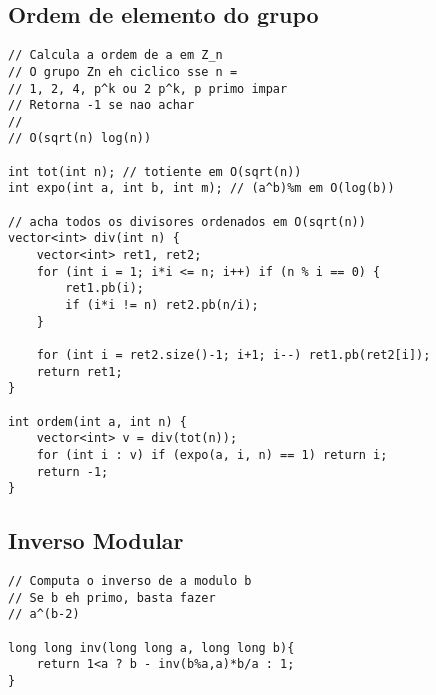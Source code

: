 \documentclass[12pt, a4paper, twoside]{article}
\begin{document}
\subsection{Ordem de elemento do grupo}
\begin{lstlisting}
// Calcula a ordem de a em Z_n
// O grupo Zn eh ciclico sse n = 
// 1, 2, 4, p^k ou 2 p^k, p primo impar
// Retorna -1 se nao achar
//
// O(sqrt(n) log(n))

int tot(int n); // totiente em O(sqrt(n))
int expo(int a, int b, int m); // (a^b)%m em O(log(b))

// acha todos os divisores ordenados em O(sqrt(n))
vector<int> div(int n) {
	vector<int> ret1, ret2;
	for (int i = 1; i*i <= n; i++) if (n % i == 0) {
		ret1.pb(i);
		if (i*i != n) ret2.pb(n/i);
	}

	for (int i = ret2.size()-1; i+1; i--) ret1.pb(ret2[i]);
	return ret1;
}

int ordem(int a, int n) {
	vector<int> v = div(tot(n));
	for (int i : v) if (expo(a, i, n) == 1) return i;
	return -1;
}
\end{lstlisting}

\subsection{Inverso Modular}
\begin{lstlisting}
// Computa o inverso de a modulo b
// Se b eh primo, basta fazer
// a^(b-2)

long long inv(long long a, long long b){
	return 1<a ? b - inv(b%a,a)*b/a : 1;
}
\end{lstlisting}
\end{document}
